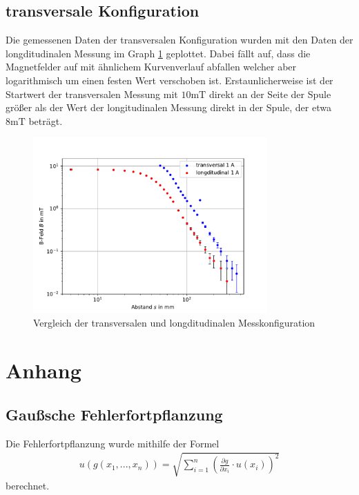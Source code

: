 \documentclass[11pt, a4paper]{article}
\begin{document}
    \subsection{transversale Konfiguration}
    Die gemessenen Daten der transversalen Konfiguration wurden mit den Daten der longditudinalen Messung im Graph \ref{fig:LogVergleich} geplottet.
    Dabei fällt auf, dass die Magnetfelder auf mit ähnlichem Kurvenverlauf abfallen welcher aber logarithmisch um einen festen Wert verschoben ist.
    Erstaunlicherweise ist der Startwert der transversalen Messung mit $10 \si{\milli\tesla}$ direkt an der Seite der Spule größer als der Wert der longitudinalen Messung direkt in der Spule, der etwa $8 \si{\milli\tesla}$ beträgt.
    \begin{figure}[h]
        \centering
        \includegraphics[width=0.8\textwidth]{logarithmischerVergleich.pdf}
        \caption{Vergleich der transversalen und longditudinalen Messkonfiguration}
        \label{fig:LogVergleich}
    \end{figure}





    \section{Anhang}
    \subsection{Gaußsche Fehlerfortpflanzung}
    Die Fehlerfortpflanzung wurde mithilfe der Formel
    \begin{align}
        u\left(g \left(x_1, ..., x_n\right)\right) = \sqrt{\sum_{i=1}^n \left( \frac{\partial g }{\partial x_i} \cdot u\left(x_i\right) \right)^2} \label{gauss}
    \end{align}
    berechnet.
    
    
\end{document}
